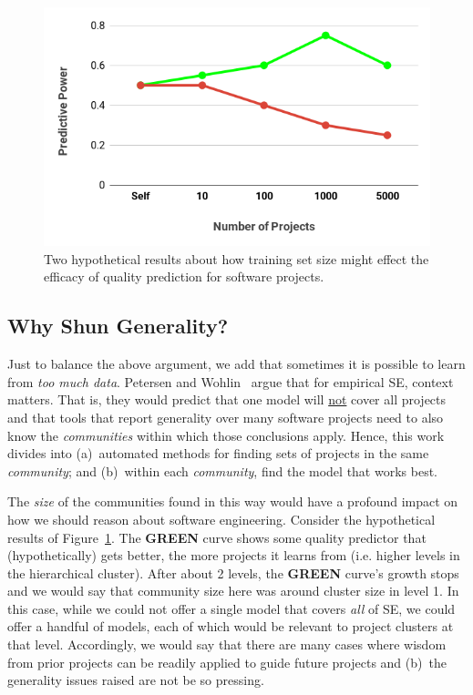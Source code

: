 \documentclass[10pt,journal,compsoc]{IEEEtran}
\begin{document}
\begin{figure}[!b]
    \centering
    \includegraphics[width=\linewidth]{figs/predictive_power.png}
    \caption{Two hypothetical results about how training set size might effect the efficacy of quality prediction for software projects.}
    \label{fig:predictive_power}
\end{figure}



\subsection{Why Shun Generality?}
Just to balance the above argument,
we add that   sometimes it is possible to learn from
{\em too much data}.
Petersen and Wohlin~\cite{Petersen2009} argue that for empirical SE, context matters. That is, they would predict that one model  will \underline{not}  cover all  projects and that tools that report  generality  over many software projects need to also know the {\em communities} within which those conclusions   apply. Hence, this work divides into (a)~automated methods for finding sets of projects in the same {\em community}; and (b)~within each {\em community}, find the model that works best. 


The {\em size} of the communities found in this way would have a profound impact on how we should reason about software engineering. Consider the hypothetical results of Figure~\ref{fig:predictive_power}. The \textcolor{ao(english)}{{\bf GREEN}} curve shows some quality predictor that (hypothetically) gets better, the more projects it learns from (i.e. higher levels in the hierarchical cluster). After about 2 levels, the \textcolor{ao(english)}{{\bf GREEN}} curve's growth stops and we would say that community size here was around cluster size in level 1. In this case, while we could not offer a single model that covers {\em all} of SE, we could offer a handful of models, each of which would be relevant to project clusters at that level. Accordingly, we would say that there are many cases where  wisdom from prior projects can be readily applied to guide future projects and (b)~the generality issues raised are not be so pressing.
\end{document}
